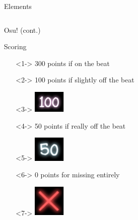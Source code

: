\documentclass[table]{beamer}
\begin{document}
\begin{frame}[fragile]{Elements}
\begin{columns}[c]
  \end{columns}
\end{frame}

\begin{frame}{Osu! (cont.)}
  \begin{block}{Scoring}
    \begin{itemize}
    \item[]<1-> 300 points if on the beat
    \item[]<2-> 100 points if slightly off the beat
    \item[]<3-> \includegraphics[width=0.12\textwidth]{images/hit100.png}
    \item[]<4-> 50 points if really off the beat
    \item[]<5-> \includegraphics[width=0.12\textwidth]{images/hit50.png}
    \item[]<6-> 0 points for missing entirely
    \item[]<7-> \includegraphics[width=0.12\textwidth]{images/hit0.png}
    \end{itemize}
  \end{block}
\end{frame}
\end{document}
